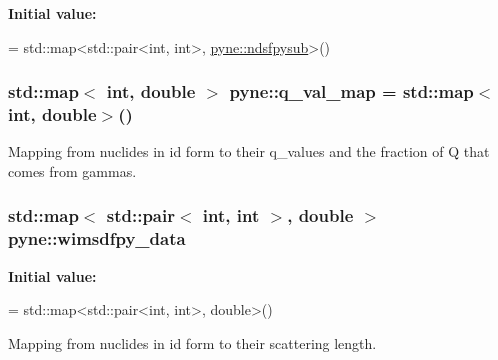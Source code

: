 {\bfseries Initial value\+:}
\begin{DoxyCode}
= 
  std::map<std::pair<int, int>, \hyperlink{structpyne_1_1ndsfpysub}{pyne::ndsfpysub}>()
\end{DoxyCode}
\hypertarget{namespacepyne_af7b850fa105454bc35f4167d41071239}{
\subsubsection[{q\+\_\+val\+\_\+map}]{\setlength{\rightskip}{0pt plus 5cm}std\+::map$<$ int, double $>$ pyne\+::q\+\_\+val\+\_\+map = std\+::map$<$int, double$>$()}}\label{namespacepyne_af7b850fa105454bc35f4167d41071239}
Mapping from nuclides in id form to their q\+\_\+values and the fraction of Q that comes from gammas. \hypertarget{namespacepyne_a2512ebcde5e39e49cd6ed25bb09ff374}{
\subsubsection[{wimsdfpy\+\_\+data}]{\setlength{\rightskip}{0pt plus 5cm}std\+::map$<$ std\+::pair$<$ int, int $>$, double $>$ pyne\+::wimsdfpy\+\_\+data}}\label{namespacepyne_a2512ebcde5e39e49cd6ed25bb09ff374}
{\bfseries Initial value\+:}
\begin{DoxyCode}
= 
  std::map<std::pair<int, int>, \textcolor{keywordtype}{double}>()
\end{DoxyCode}


Mapping from nuclides in id form to their scattering length. 

